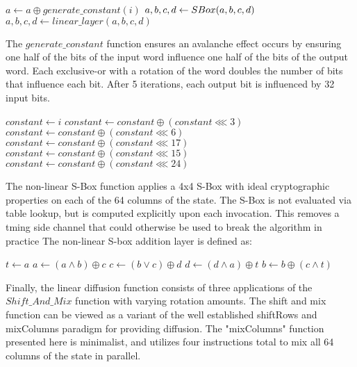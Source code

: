 \documentclass[preprint]{iacrtrans}
\begin{document}
\begin{algorithmic}
	\State $a \gets a \oplus generate\_constant(i)$
	\State $a, b, c, d \gets S\-Box(a, b, c, d)$
	\State $a, b, c, d \gets linear\_layer(a, b, c, d)$
\EndFunction\\
\end{algorithmic}

The $generate\_constant$ function ensures an avalanche effect occurs by ensuring one half of the bits of the input word influence one half of the bits of the output word. Each exclusive-or with a rotation of the word doubles the number of bits that influence each bit. After 5 iterations, each output bit is influenced by 32 input bits.\\

\begin{algorithmic}
	\State $constant \gets i$
	\State $constant \gets constant \oplus (constant \lll 3)$
	\State $constant \gets constant \oplus (constant \lll 6)$
	\State $constant \gets constant \oplus (constant \lll 17)$
	\State $constant \gets constant \oplus (constant \lll 15)$
	\State $constant \gets constant \oplus (constant \lll 24)$	
\EndFunction\\
\end{algorithmic}

The non-linear S-Box function applies a 4x4 S-Box with ideal cryptographic properties on each of the 64 columns of the state. The S-Box is not evaluated via table lookup, but is computed explicitly upon each invocation. This removes a tming side channel that could otherwise be used to break the algorithm in practice The non-linear S-box addition layer is defined as: \\

\begin{algorithmic}
	\State $t \gets a$
	\State $a \gets (a \land b) \oplus c$
	\State $c \gets (b \lor c) \oplus d$
	\State $d \gets (d \land a) \oplus t$
	\State $b \gets b \oplus (c \land t)$
\EndFunction\\
\end{algorithmic}

Finally, the linear diffusion function consists of three applications of the $Shift\_And\_Mix$ function with varying rotation amounts. The shift and mix function can be viewed as a variant of the well established shiftRows and mixColumns paradigm for providing diffusion. The "mixColumns" function presented here is minimalist, and utilizes four instructions total to mix all 64 columns of the state in parallel. \\
\end{document}
